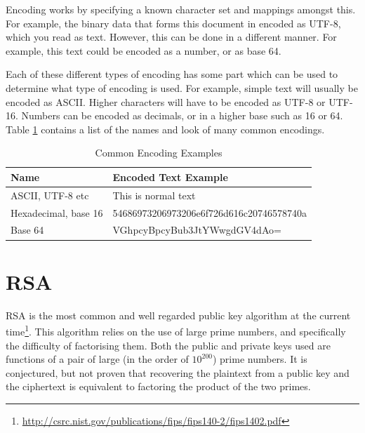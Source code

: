 				Encoding works by specifying a known character set and mappings amongst this.
				For example, the binary data that forms this document in encoded as UTF-8, which you read as text.
				However, this can be done in a different manner.
				For example, this text could be encoded as a number, or as base 64.

				Each of these different types of encoding has some part which can be used to determine what type of encoding is used.
				For example, simple text will usually be encoded as ASCII.
				Higher characters will have to be encoded as UTF-8 or UTF-16.
				Numbers can be encoded as decimals, or in a higher base such as 16 or 64.
				Table \ref{tab:Encodings} contains a list of the names and look of many common encodings.
				\begin{table}[htb]
					\centering
				\begin{adjustbox}{max width=1\textwidth}
					\begin{tabular}{ll}
						\toprule
						\textbf{Name} & \textbf{Encoded Text Example} \\
						\toprule
						ASCII, UTF-8 etc & This is normal text \\
						Hexadecimal, base 16 & 54686973206973206e6f726d616c20746578740a \\
						Base 64 & VGhpcyBpcyBub3JtYWwgdGV4dAo= \\
						\bottomrule
					\end{tabular}
				\end{adjustbox}
					\caption{Common Encoding Examples}
					\label{tab:Encodings}
				\end{table}
	\section{RSA}
		RSA is the most common and well regarded public key algorithm at the current time\footnote{\url{http://csrc.nist.gov/publications/fips/fips140-2/fips1402.pdf}}.
		This algorithm relies on the use of large prime numbers, and specifically the difficulty of factorising them.
		Both the public and private keys used are functions of a pair of large (in the order of $10^{200}$) prime numbers.
		It is conjectured, but not proven that recovering the plaintext from a public key and the ciphertext is equivalent to factoring the product of the two primes.

